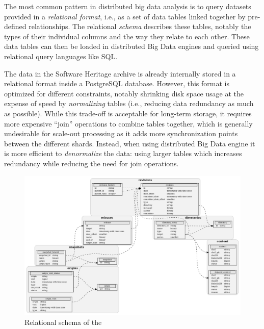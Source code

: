 The most common pattern in distributed big data analysis is to query datasets
provided in a \emph{relational format}, i.e., as a set of data tables linked
together by pre-defined relationships. The relational \emph{schema} describes
these tables, notably the types of their individual columns and the way they
relate to each other. These data tables can then be loaded in distributed Big
Data engines and queried using relational query languages like SQL.

The data in the Software Heritage archive is already internally stored in a
relational format inside a PostgreSQL database. However, this format is
optimized for different constraints, notably shrinking disk space usage at the
expense of speed by \emph{normalizing} tables (i.e., reducing data redundancy
as much as possible). While this trade-off is acceptable for long-term storage,
it requires more expensive ``join'' operations to combine tables together,
which is generally undesirable for scale-out processing as it adds more
synchronization points between the different shards. Instead, when using
distributed Big Data engine it is more efficient to \emph{denormalize} the
data: using larger tables which increases redundancy while reducing the need
for join operations.

\begin{figure}
    \includegraphics[width=\linewidth]{img/graph-dataset/db-schema}
    \caption{Relational schema of the \SWHGD{}}%
    \label{fig:swh-dataset-schema}
\end{figure}

